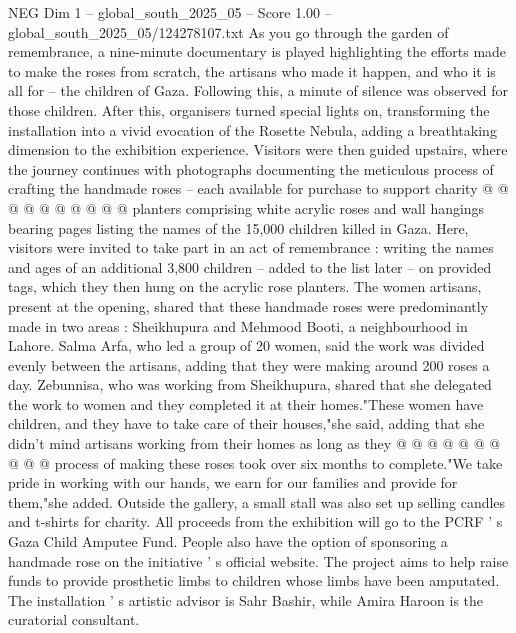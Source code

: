 \begin{textsample}{NEG Dim 1 – global\_south\_2025\_05 – Score 1.00 – global\_south\_2025\_05/124278107.txt}
As you go through the garden of remembrance, a nine-minute documentary is played highlighting the efforts made to make the roses from scratch, the artisans who made it happen, and who it is all for -- the children of Gaza.
Following this, a minute of silence was observed for those children.
After this, organisers turned special lights on, transforming the installation into a vivid evocation of the Rosette Nebula, adding a breathtaking dimension to the exhibition experience.
Visitors were then guided upstairs, where the journey continues with photographs documenting the meticulous process of crafting the handmade roses -- each available for purchase to support charity @ @ @ @ @ @ @ @ @ @ planters comprising white acrylic roses and wall hangings bearing pages listing the names of the 15,000 children killed in Gaza.
Here, visitors were invited to take part in an act of remembrance : writing the names and ages of an additional 3,800 children -- added to the list later -- on provided tags, which they then hung on the acrylic rose planters.
The women artisans, present at the opening, shared that these handmade roses were predominantly made in two areas : Sheikhupura and Mehmood Booti, a neighbourhood in Lahore.
Salma Arfa, who led a group of 20 women, said the work was divided evenly between the artisans, adding that they were making around 200 roses a day.
Zebunnisa, who was working from Sheikhupura, shared that she delegated the work to women and they completed it at their homes."These women have children, and they have to take care of their houses,"she said, adding that she didn't mind artisans working from their homes as long as they @ @ @ @ @ @ @ @ @ @ process of making these roses took over six months to complete."We take pride in working with our hands, we earn for our families and provide for them,"she added.
Outside the gallery, a small stall was also set up selling candles and t-shirts for charity.
All proceeds from the exhibition will go to the PCRF ' s Gaza Child Amputee Fund.
People also have the option of sponsoring a handmade rose on the initiative ' s official website.
The project aims to help raise funds to provide prosthetic limbs to children whose limbs have been amputated.
The installation ' s artistic advisor is Sahr Bashir, while Amira Haroon is the curatorial consultant.

\end{textsample}

